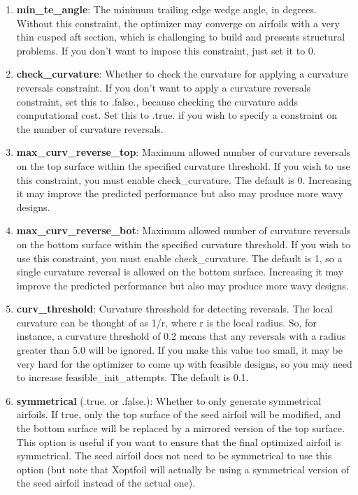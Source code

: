 \documentclass[11pt]{article}
\begin{document}
\begin{enumerate}
{selection type in operating\_conditions, where positive corresponds to a downward
deflection.}
\item{\textbf{min\_te\_angle}: The minimum trailing edge wedge angle, in degrees.  Without
this constraint, the optimizer may converge on airfoils with a very thin cusped aft
section, which is challenging to build and presents structural problems.  If you don't
want to impose this constraint, just set it to 0.}
\item{\textbf{check\_curvature}: Whether to check the curvature for applying a curvature
reversals constraint.  If you don't want to apply a curvature reversals constraint, set
this to .false., because checking the curvature adds computational cost.  Set this to
.true. if you wish to specify a constraint on the number of curvature reversals.}
\item{\textbf{max\_curv\_reverse\_top}: Maximum allowed number of curvature reversals on
the top surface within the specified curvature threshold.  If you wish to use this 
constraint, you must enable check\_curvature. The default is 0. Increasing it may improve
the predicted performance but also may produce more wavy designs.}
\item{\textbf{max\_curv\_reverse\_bot}: Maximum allowed number of curvature reversals on
the bottom surface within the specified curvature threshold.  If you wish to use this 
constraint, you must enable check\_curvature. The default is 1, so a single curvature
reversal is allowed on the bottom surface.  Increasing it may improve the predicted
performance but also may produce more wavy designs.}
\item{\textbf{curv\_threshold}: Curvature thresshold for detecting reversals.  The local
curvature can be thought of as 1/r, where r is the local radius.  So, for instance, a
curvature threshold of 0.2 means that any reversals with a radius greater than 5.0 will
be ignored.  If you make this value too small, it may be very hard for the optimizer to
come up with feasible designs, so you may need to increase feasible\_init\_attempts. The
default is 0.1.} 
\item{\textbf{symmetrical} (.true. or .false.): Whether to only generate symmetrical 
airfoils.  If true, only the top surface of the seed airfoil will be modified, and the
bottom surface will be replaced by a mirrored version of the top surface. This option is
useful if you want to ensure that the final optimized airfoil is symmetrical.  The seed 
airfoil does not need
to be symmetrical to use this option (but note that Xoptfoil will actually be using a
symmetrical version of the seed airfoil instead of the actual one).}
\end{enumerate}
\end{document}
